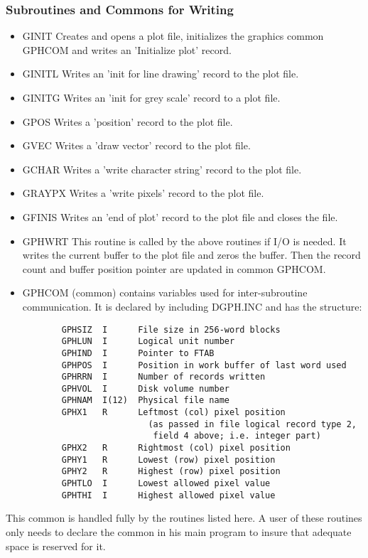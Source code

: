 \subsubsection{Subroutines and Commons for Writing}
\begin{itemize}
\item GINIT   Creates and opens a plot file, initializes
the graphics
common GPHCOM and writes an 'Initialize plot' record.
\item GINITL  Writes an 'init for line drawing' record
to the plot file.
\item GINITG  Writes an 'init for grey scale' record to
a plot file.
\item GPOS    Writes a 'position' record to the plot file.
\item GVEC    Writes a 'draw vector' record to the plot
file.
\item GCHAR   Writes a 'write character string' record to
the plot file.
\item GRAYPX  Writes a 'write pixels' record to the plot
file.
\item GFINIS  Writes an 'end of plot' record to the plot
file and closes
the file.
\item GPHWRT  This routine is called by the above
routines if I/O is needed.
It writes the current buffer to the plot file and zeros the
buffer.  Then the record count and buffer position pointer
are updated in common GPHCOM.
\item GPHCOM  (common) contains variables used for
inter-subroutine
communication.  It is declared by including DGPH.INC and has the
structure:
\end{itemize}
\begin{verbatim}
           GPHSIZ  I      File size in 256-word blocks
           GPHLUN  I      Logical unit number
           GPHIND  I      Pointer to FTAB
           GPHPOS  I      Position in work buffer of last word used
           GPHRRN  I      Number of records written
           GPHVOL  I      Disk volume number
           GPHNAM  I(12)  Physical file name
           GPHX1   R      Leftmost (col) pixel position
                            (as passed in file logical record type 2,
                             field 4 above; i.e. integer part)
           GPHX2   R      Rightmost (col) pixel position
           GPHY1   R      Lowest (row) pixel position
           GPHY2   R      Highest (row) pixel position
           GPHTLO  I      Lowest allowed pixel value
           GPHTHI  I      Highest allowed pixel value
\end{verbatim}
This common is handled fully by the routines listed here.  A
user of these routines only needs to declare the common in his
main program to insure that adequate space is reserved for it.
 
